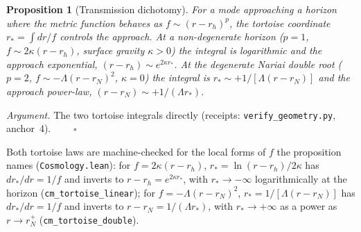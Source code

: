\documentclass[11pt,a4paper]{article}
\theoremstyle{plain}
\newtheorem{proposition}{Proposition}
\theoremstyle{definition}
\theoremstyle{remark}
\begin{document}
\begin{proposition}[Transmission dichotomy]\label{prop:transmission}
For a mode approaching a horizon where the metric function behaves as $f\sim(r-r_h)^p$, the tortoise coordinate $r_*=\int dr/f$ controls the approach. At a non-degenerate horizon ($p=1$, $f\sim2\kappa(r-r_h)$, surface gravity $\kappa>0$) the integral is logarithmic and the approach exponential, $(r-r_h)\sim e^{2\kappa r_*}$. At the degenerate Nariai double root ($p=2$, $f\sim-\Lambda(r-r_{N})^2$, $\kappa=0$) the integral is $r_*\sim+1/[\Lambda(r-r_{N})]$ and the approach power-law, $(r-r_{N})\sim+1/(\Lambda r_*)$.
\end{proposition}

\noindent\emph{Argument.} The two tortoise integrals directly (receipts: \texttt{verify\_geometry.py}, anchor~4). $\qquad\square$

Both tortoise laws are machine-checked for the local forms of $f$ the proposition names (\texttt{Cosmology.lean}): for $f=2\kappa(r-r_h)$, $r_*=\ln(r-r_h)/2\kappa$ has $dr_*/dr=1/f$ and inverts to $r-r_h=e^{2\kappa r_*}$, with $r_*\to-\infty$ logarithmically at the horizon (\texttt{cm\_tortoise\_linear}); for $f=-\Lambda(r-r_{N})^{2}$, $r_*=1/[\Lambda(r-r_{N})]$ has $dr_*/dr=1/f$ and inverts to $r-r_{N}=1/(\Lambda r_*)$, with $r_*\to+\infty$ as a power as $r\to r_{N}^{+}$ (\texttt{cm\_tortoise\_double}).
\end{document}
